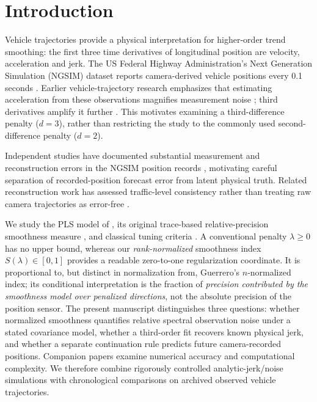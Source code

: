 \section{Introduction}
Vehicle trajectories provide a physical interpretation for higher-order trend smoothing: the first three time derivatives of longitudinal position are velocity, acceleration and jerk. The US Federal Highway Administration's Next Generation Simulation (NGSIM) dataset reports camera-derived vehicle positions every 0.1 seconds \citep{fhwa2016}. Earlier vehicle-trajectory research emphasizes that estimating acceleration from these observations magnifies measurement noise \citep{thiemann2008}; third derivatives amplify it further \citep{ahnert2007,chartrand2011}. This motivates examining a third-difference penalty ($d=3$), rather than restricting the study to the commonly used second-difference penalty ($d=2$).

Independent studies have documented substantial measurement and
reconstruction errors in the NGSIM position records
\citep{punzo2011,coifman2017}, motivating careful separation of
recorded-position forecast error from latent physical truth.
Related reconstruction work has assessed traffic-level consistency
rather than treating raw camera trajectories as error-free
\citep{montanino2015}.

We study the PLS model of \citet{guerrero2007}, its original
trace-based relative-precision smoothness measure
\citep{guerrero2007,guerrero2008,cortes2017}, and classical
tuning criteria \citep{cortes2017}. A conventional penalty
$\lambda\ge0$ has no upper bound, whereas our
\emph{rank-normalized} smoothness index $S(\lambda)\in[0,1]$
provides a readable zero-to-one regularization coordinate.
It is proportional to, but distinct in normalization from,
Guerrero's $n$-normalized index; its conditional interpretation
is the fraction of \emph{precision contributed by the
smoothness model over penalized directions}, not the absolute
precision of the position sensor. The present manuscript distinguishes three questions: whether normalized smoothness quantifies relative spectral observation noise under a stated covariance model, whether a third-order fit recovers known physical jerk, and whether a separate continuation rule predicts future camera-recorded positions. Companion papers examine numerical accuracy and computational complexity. We therefore combine rigorously controlled analytic-jerk/noise simulations with chronological comparisons on archived observed vehicle trajectories.

